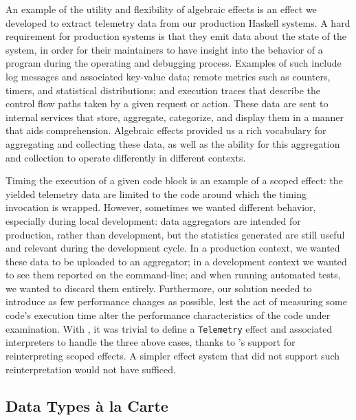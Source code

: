 \documentclass[acmsmall,fleqn,12pt]{acmart}
\begin{document}
An example of the utility and flexibility of algebraic effects is an effect we
developed to extract telemetry data from our production Haskell systems. A
hard requirement for production systems is that they emit data about the state
of the system, in order for their maintainers to have insight into the
behavior of a program during the operating and debugging process. Examples of
such include log messages and associated key-value data; remote metrics such
as counters, timers, and statistical distributions; and execution traces that
describe the control flow paths taken by a given request or action. These data
are sent to internal services that store, aggregate, categorize, and display
them in a manner that aids comprehension. Algebraic effects provided us a rich
vocabulary for aggregating and collecting these data, as well as the ability
for this aggregation and collection to operate differently in different
contexts.

Timing the execution of a given code block is an example of a scoped effect: the
yielded telemetry data are limited to the code around which the timing invocation
is wrapped. However, sometimes we wanted different behavior, especially during
local development: data aggregators are intended for production, rather than
development, but the statistics generated are still useful and relevant during
the development cycle. In a production context, we wanted these data to be
uploaded to an aggregator; in a development context we wanted to see them
reported on the command-line; and when running automated tests, we wanted to
discard them entirely. Furthermore, our solution needed to introduce as few
performance changes as possible, lest the act of measuring some code's execution
time alter the performance characteristics of the code under examination. With
\fe{}, it was trivial to define a \texttt{Telemetry} effect and associated
interpreters to handle the three above cases, thanks to \fe{}'s support for
reinterpreting scoped effects. A simpler effect system that did not support
such reinterpretation would not have sufficed.

\subsection{Data Types à la Carte} \label{sec:dtalc}
\end{document}
